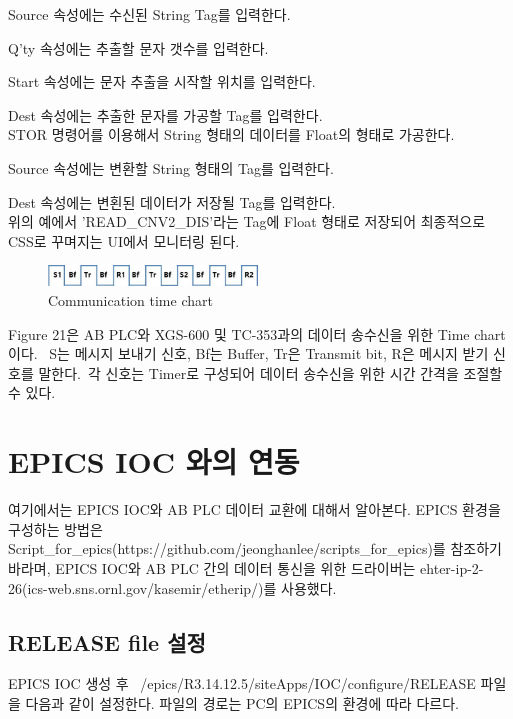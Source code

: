 \documentclass[11pt
  , a4paper
  , article
  , oneside
]{memoir}
\begin{document}
Source 속성에는 수신된 String Tag를 입력한다.\

Q'ty 속성에는 추출할 문자 갯수를 입력한다.\

Start 속성에는 문자 추출을 시작할 위치를 입력한다.\

Dest 속성에는 추출한 문자를 가공할 Tag를 입력한다.\\

STOR 명령어를 이용해서 String 형태의 데이터를 Float의 형태로 가공한다.\

Source 속성에는 변환할 String 형태의 Tag를 입력한다.\

Dest 속성에는 변횐된 데이터가 저장될 Tag를 입력한다.\\

위의 예에서 'READ\_CNV2\_DIS'라는 Tag에 Float 형태로 저장되어 최종적으로 CSS로 꾸며지는 UI에서 모니터링 된다.\\

\begin{figure}[h]
	\centering
	\includegraphics[width=0.5\textwidth]{./picture/timer_bit.jpg}
	\caption{Communication time chart}
	\label{fig:}
\end{figure}

Figure 21은 AB PLC와 XGS-600 및 TC-353과의 데이터 송수신을 위한 Time chart 이다. \
S는 메시지 보내기 신호, Bf는 Buffer, Tr은 Transmit bit, R은 메시지 받기 신호를 말한다.\
각 신호는 Timer로 구성되어 데이터 송수신을 위한 시간 간격을 조절할 수 있다. 

\newpage

\chapter{EPICS IOC 와의 연동}
여기에서는 EPICS IOC와 AB PLC 데이터 교환에 대해서 알아본다. EPICS 환경을 구성하는 방법은 Script\_for\_epics(https://github.com/jeonghanlee/scripts\_for\_epics)를 참조하기 바라며, EPICS IOC와 AB PLC 간의 데이터 통신을 위한 드라이버는 ehter-ip-2-26(ics-web.sns.ornl.gov/kasemir/etherip/)를 사용했다. \\

\section{RELEASE file 설정}
EPICS IOC 생성 후 ~/epics/R3.14.12.5/siteApps/IOC/configure/RELEASE 파일을 다음과 같이 설정한다. 파일의 경로는 PC의 EPICS의 환경에 따라 다르다.\\
\end{document}
